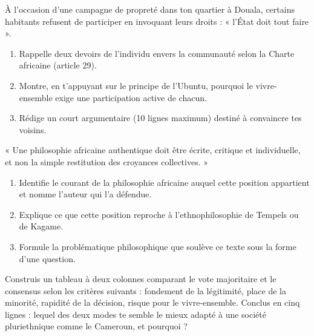 \documentclass[11pt]{article}
\newcommand{\cle}[1]{{\popxbold\color{popdark}#1}}
\newcounter{popsec}
\newcounter{popsub}
\newcommand{\courssub}[1]{%
  \stepcounter{popsub}%
  \par\vspace{9pt}\noindent{\popxbold\fontsize{11.5}{13}\selectfont\color{popink}{\color{poporange}\thepopsec.\thepopsub}\hspace{6pt}#1}\par\nopagebreak\vspace{4pt}
}
\begin{document}
\begin{exercice}
À l'occasion d'une campagne de propreté dans ton quartier à Douala, certains habitants refusent de participer en invoquant leurs droits : « l'État doit tout faire ».
\begin{enumerate}
\item Rappelle deux devoirs de l'individu envers la communauté selon la Charte africaine (article 29).
\item Montre, en t'appuyant sur le principe de l'Ubuntu, pourquoi le vivre-ensemble exige une participation active de chacun.
\item Rédige un court argumentaire (10 lignes maximum) destiné à convaincre tes voisins.
\end{enumerate}
\end{exercice}

\begin{exercice}
« Une philosophie africaine authentique doit être écrite, critique et individuelle, et non la simple restitution des croyances collectives. »
\begin{enumerate}
\item Identifie le courant de la philosophie africaine auquel cette position appartient et nomme l'auteur qui l'a défendue.
\item Explique ce que cette position reproche à l'ethnophilosophie de Tempels ou de Kagame.
\item Formule la problématique philosophique que soulève ce texte sous la forme d'une question.
\end{enumerate}
\end{exercice}

\begin{exercice}
Construis un tableau à deux colonnes comparant le \cle{vote majoritaire} et le \cle{consensus} selon les critères suivants : fondement de la légitimité, place de la minorité, rapidité de la décision, risque pour le vivre-ensemble. Conclus en cinq lignes : lequel des deux modes te semble le mieux adapté à une société pluriethnique comme le Cameroun, et pourquoi ?
\end{exercice}

\courssub{Je me prépare au Bac}
\end{document}
